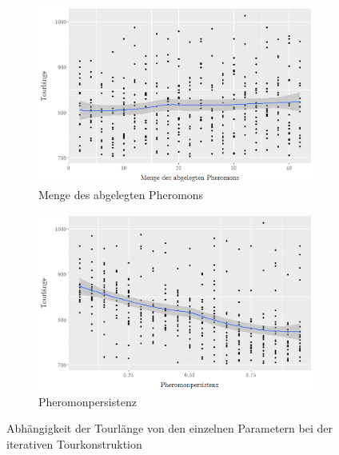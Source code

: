 \documentclass[doktyp=barbeit, sprache=german]{TUBAFarbeiten}
\begin{document}
\begin{figure}
\begin{subfigure}[b]{0.475\textwidth}
            \includegraphics[width=\textwidth]{images/diagramiterativedeposit}
            \caption{Menge des abgelegten Pheromons}   
            \label{fig:iterativeDeposit}
        \end{subfigure}
        \quad
        \begin{subfigure}[b]{0.475\textwidth}   
            \centering 
            \includegraphics[width=\textwidth]{images/diagramiterativereduction}
            \caption{Pheromonpersistenz}   
            \label{fig:iterativeReduction}
        \end{subfigure}
        \caption{Abhängigkeit der Tourlänge von den einzelnen Parametern bei der iterativen Tourkonstruktion } 
        \label{fig:iterativeDiagram}
    \end{figure}
\end{document}
